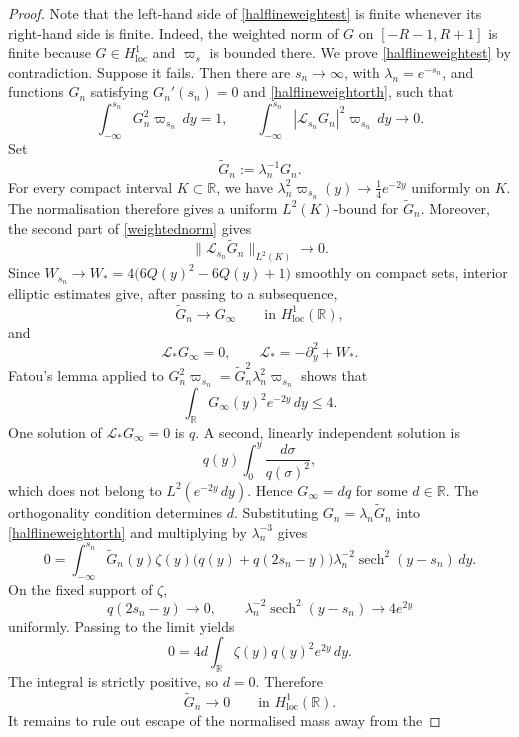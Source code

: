 \documentclass[11pt,a4paper]{article}
\DeclareMathOperator{\sech}{sech}
\numberwithin{equation}{section}
\theoremstyle{plain}
\theoremstyle{remark}
\begin{document}
\begin{proof}
Note that the left-hand side of
\eqref{halflineweightest} is finite whenever its
right-hand side is finite. Indeed, the weighted norm of $G$ on
$[-R-1,R+1]$ is finite because $G\in H^1_{\mathrm{loc}}$ and
$\varpi_s$ is bounded there. We prove \eqref{halflineweightest} by contradiction.
Suppose it fails. Then there are $s_n\to\infty$, with
$\lambda_n=e^{-s_n}$, and functions $G_n$ satisfying
$G_n'(s_n)=0$ and
\eqref{halflineweightorth}, such that
\begin{equation}\label{weightednorm}
\int_{-\infty}^{s_n}G_n^2\varpi_{s_n}\,dy=1,
\qquad
\int_{-\infty}^{s_n}|\mathscr L_{s_n}G_n|^2
\varpi_{s_n}\,dy\longrightarrow0.
\end{equation}
Set
$$
\widetilde G_n:=\lambda_n^{-1}G_n.
$$
For every compact interval $K\subset\mathbb R$, we have $\lambda_n^2\varpi_{s_n}(y)
\longrightarrow
\frac14e^{-2y}$ uniformly on $K$. The normalisation therefore gives a uniform
$L^2(K)$-bound for $\widetilde G_n$. Moreover,
the second part of \eqref{weightednorm} gives
$$
\|\mathscr L_{s_n}\widetilde G_n\|_{L^2(K)}\longrightarrow0.
$$
Since $W_{s_n}\to W_*=4\bigl(6Q(y)^2-6Q(y)+1\bigr)$ smoothly on compact sets, interior elliptic estimates give, after passing to a subsequence,
$$
\widetilde G_n\longrightarrow G_\infty
\qquad
\text{in }H^1_{\mathrm{loc}}(\mathbb R),
$$
and
$$
\mathscr L_*G_\infty=0,
\qquad
\mathscr L_*=-\partial_y^2+W_*.
$$
Fatou's lemma applied to $G_n^2\varpi_{s_n}
=
\widetilde G_n^2\lambda_n^2\varpi_{s_n}$ shows that
$$
\int_{\mathbb R}G_\infty(y)^2e^{-2y}\,dy\leq4.
$$
One solution of $\mathscr L_*G_\infty=0$ is $q$. A second, linearly independent
solution is
$$
q(y)\int_0^y\frac{d\sigma}{q(\sigma)^2},
$$
which does not belong to $L^2(e^{-2y}\,dy)$. Hence $G_\infty=dq$ for some $d\in\mathbb R$.
The orthogonality condition determines $d$. Substituting
$G_n=\lambda_n\widetilde G_n$ into
\eqref{halflineweightorth} and multiplying by
$\lambda_n^{-3}$ gives
$$
0
=
\int_{-\infty}^{s_n}
\widetilde G_n(y)\zeta(y)
\bigl(q(y)+q(2s_n-y)\bigr)
\lambda_n^{-2}\sech^2(y-s_n)\,dy.
$$
On the fixed support of $\zeta$,
$$
q(2s_n-y)\longrightarrow0,
\qquad
\lambda_n^{-2}\sech^2(y-s_n)
\longrightarrow4e^{2y}
$$
uniformly. Passing to the limit yields
$$
0
=
4d\int_{\mathbb R}\zeta(y)q(y)^2e^{2y}\,dy.
$$
The integral is strictly positive, so $d=0$. Therefore
\begin{equation}\label{Gntozero}
\widetilde G_n\longrightarrow0
\qquad
\text{in }H^1_{\mathrm{loc}}(\mathbb R).
\end{equation}
It remains to rule out escape of the normalised mass away from the

\end{proof}
\end{document}

